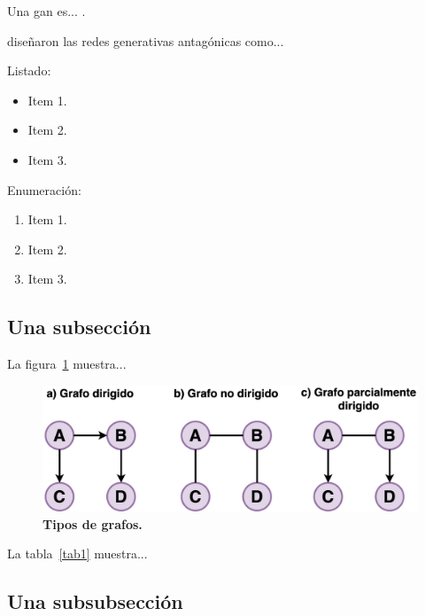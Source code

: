 Una \acrfull{gan} es... \citep{goodfellow2014generative}.
\medskip

\citet{goodfellow2014generative} diseñaron las redes generativas antagónicas como...
\medskip

\vspace{5ex}

Listado:
\begin{itemize}
  \item Item 1.
  \item Item 2.
  \item Item 3.
\end{itemize}

Enumeración:
\begin{enumerate}
  \item Item 1.
  \item Item 2.
  \item Item 3.
\end{enumerate}

\subsection{Una subsección}
\label{una-subseccion}

La figura~\ref{fig1} muestra...

\begin{figure}[ht!]
    \centering
    \includegraphics[scale=0.15]{figuras/fig1.png}
    \caption[Tipos de grafos]{\textbf{Tipos de grafos.}}
    \label{fig1}
\end{figure}

La tabla~\ref{tab1} muestra...



\subsection{Una subsubsección}
\label{una-subsubseccion}

